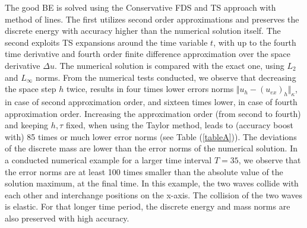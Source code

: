 \documentclass[%
 aip,
cp,  
 amsmath,amssymb,
 reprint,
]{iopconfser}
\newcommand{\rf}[1]{(\ref{#1})}
\begin{document}
The good BE is solved using the Conservative FDS and TS approach with method of lines. The first utilizes second order approximations and preserves the discrete energy with accuracy higher than the numerical solution itself. The second exploits TS expansions around the time variable $t$, with up to the fourth time derivative and fourth order finite difference approximation over the space derivative $\Delta u$. The numerical solution is compared with the exact one, using $L_2$ and $L_\infty$ norms. From the numerical tests conducted, we observe that decreasing the space step $h$ twice, results in four times lower errors norms $\Vert u_{h} - (u_{ex})_{h} \Vert_\kappa$, in case of second approximation order, and sixteen times lower, in case of fourth approximation order. Increasing the approximation order (from second to fourth) and keeping $h, \tau$ fixed, when using the Taylor method, leads to (accuracy boost with) 85 times or much lower error norms (see Table \rf{tableA}). The deviations of the discrete mass are lower than the error norms of the numerical solution. In a conducted numerical example for a larger time interval $T=35$, we observe that the error norms are at least 100 times smaller than the absolute value of the solution maximum, at the final time. In this example, the two waves collide with each other and interchange positions on the x-axis. The collision of the two waves is elastic. For that longer time period, the discrete energy and mass norms are also preserved with high accuracy.
\end{document}
